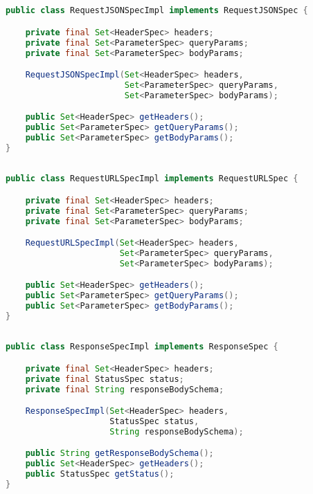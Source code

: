 \subsection{}

\begin{lstlisting}[language=Java]
public class RequestJSONSpecImpl implements RequestJSONSpec {

    private final Set<HeaderSpec> headers;
    private final Set<ParameterSpec> queryParams;
    private final Set<ParameterSpec> bodyParams;

    RequestJSONSpecImpl(Set<HeaderSpec> headers,
                        Set<ParameterSpec> queryParams,
                        Set<ParameterSpec> bodyParams);

    public Set<HeaderSpec> getHeaders();
    public Set<ParameterSpec> getQueryParams();
    public Set<ParameterSpec> getBodyParams();
}  
\end{lstlisting}

\subsection{}

\begin{lstlisting}[language=Java]
public class RequestURLSpecImpl implements RequestURLSpec {

    private final Set<HeaderSpec> headers;
    private final Set<ParameterSpec> queryParams;
    private final Set<ParameterSpec> bodyParams;

    RequestURLSpecImpl(Set<HeaderSpec> headers,
                       Set<ParameterSpec> queryParams,
                       Set<ParameterSpec> bodyParams);

    public Set<HeaderSpec> getHeaders();
    public Set<ParameterSpec> getQueryParams();
    public Set<ParameterSpec> getBodyParams();
}
\end{lstlisting}

\subsection{}

\begin{lstlisting}[language=Java]
public class ResponseSpecImpl implements ResponseSpec {

    private final Set<HeaderSpec> headers;
    private final StatusSpec status;
    private final String responseBodySchema;

    ResponseSpecImpl(Set<HeaderSpec> headers,
                     StatusSpec status,
                     String responseBodySchema);

    public String getResponseBodySchema();
    public Set<HeaderSpec> getHeaders();
    public StatusSpec getStatus();
}
\end{lstlisting}

